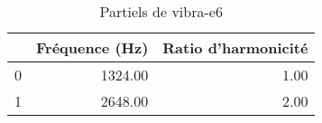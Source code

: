 \begin{table}
\centering
\caption{Partiels de vibra-e6}
\label{table:partiels-vibra-e6.wav}
\begin{tabular}{lrr}
\toprule
{} &  Fréquence (Hz) &  Ratio d'harmonicité \\
\midrule
0 &         1324.00 &                 1.00 \\
1 &         2648.00 &                 2.00 \\
\bottomrule
\end{tabular}
\end{table}
